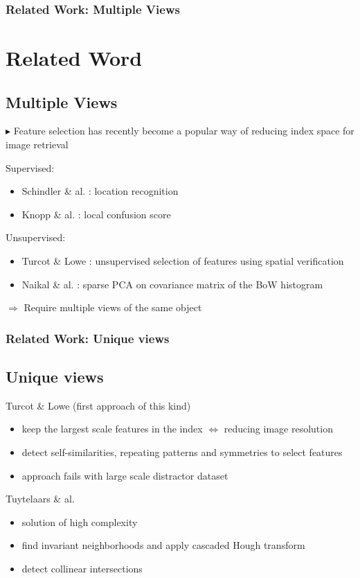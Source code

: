 \documentclass[11pt]{beamer}
\begin{document}
\begin{frame}
\frametitle{Related Work: Multiple Views}
\section{Related Word}
\subsection{Multiple Views}
$\blacktriangleright$ Feature selection has recently become a popular way of reducing index space for image retrieval

\vspace{0.3cm}

Supervised:
\begin{itemize}
\item Schindler \& al. : location recognition
\item Knopp \& al. : local confusion score
\end{itemize}
\vspace{0.3cm}
Unsupervised:
\begin{itemize}
\item Turcot \& Lowe : unsupervised selection of features using spatial verification
\item Naikal \& al. : sparse PCA on covariance matrix of the BoW histogram
\end{itemize}

$\Rightarrow$ Require multiple views of the same object

\end{frame}

\begin{frame}
\frametitle{Related Work: Unique views}
\subsection{Unique views}
Turcot \& Lowe (first approach of this kind)
\begin{itemize}
\item keep the largest scale features in the index $\Leftrightarrow$ reducing image resolution
\item detect self-similarities, repeating patterns and symmetries to select features
\item approach fails with large scale distractor dataset 
\end{itemize}
\vspace{0.3cm}
Tuytelaars \& al.
\begin{itemize}
\item solution of high complexity
\item find invariant neighborhoods and apply cascaded Hough transform
\item detect collinear intersections
\end{itemize}
\end{frame}
\end{document}
